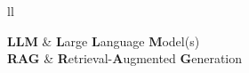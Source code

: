 \documentclass[
11pt, %
oneside, %
english, %
singlespacing, %
headsepline, %
]{style} %
\begin{document}
\begin{abbreviations}{ll} %

	\textbf{LLM} & \textbf{L}arge \textbf{L}anguage \textbf{M}odel(s)\\
	\textbf{RAG} & \textbf{R}etrieval-\textbf{A}ugmented \textbf{G}eneration\\

\end{abbreviations}












\end{document}
